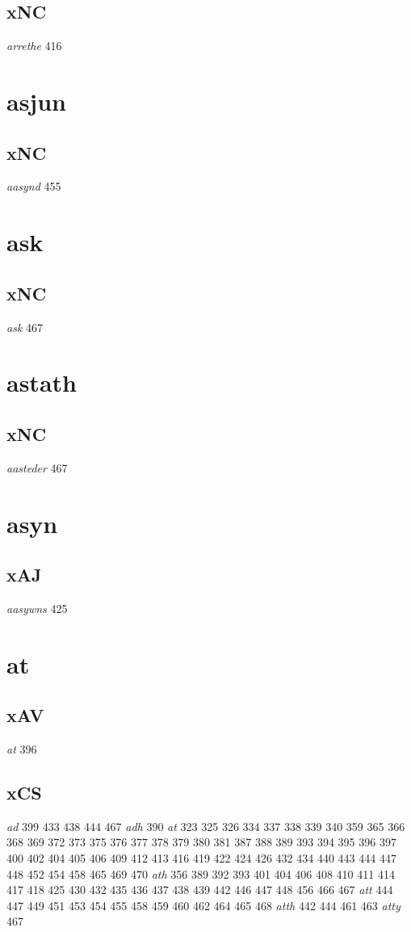 \documentclass[a4paper,twocolumn]{article}
\begin{document}
\subsection{xNC}
\label{sec:org17c2f6a}
\emph{arrethe} 416 
\section{asjun}
\label{sec:org2dba9f8}
\subsection{xNC}
\label{sec:org5cc272c}
\emph{aasynd} 455 
\section{ask}
\label{sec:org50cd88f}
\subsection{xNC}
\label{sec:orgc2a3ebc}
\emph{ask} 467 
\section{astath}
\label{sec:org3e18db0}
\subsection{xNC}
\label{sec:org29a45e0}
\emph{aasteder} 467 
\section{asyn}
\label{sec:orgb12b1fd}
\subsection{xAJ}
\label{sec:orgd7ccdd8}
\emph{aasywns} 425 
\section{at}
\label{sec:org4a6e1e4}
\subsection{xAV}
\label{sec:org9fbfaad}
\emph{at} 396 
\subsection{xCS}
\label{sec:org848c2bd}
\emph{ad} 399 433 438 444 467 \emph{adh} 390 \emph{at} 323 325 326 334 337 338 339 340 359 365 366 368 369 372 373 375 376 377 378 379 380 381 387 388 389 393 394 395 396 397 400 402 404 405 406 409 412 413 416 419 422 424 426 432 434 440 443 444 447 448 452 454 458 465 469 470 \emph{ath} 356 389 392 393 401 404 406 408 410 411 414 417 418 425 430 432 435 436 437 438 439 442 446 447 448 456 466 467 \emph{att} 444 447 449 451 453 454 455 458 459 460 462 464 465 468 \emph{atth} 442 444 461 463 \emph{atty} 467 
\end{document}
